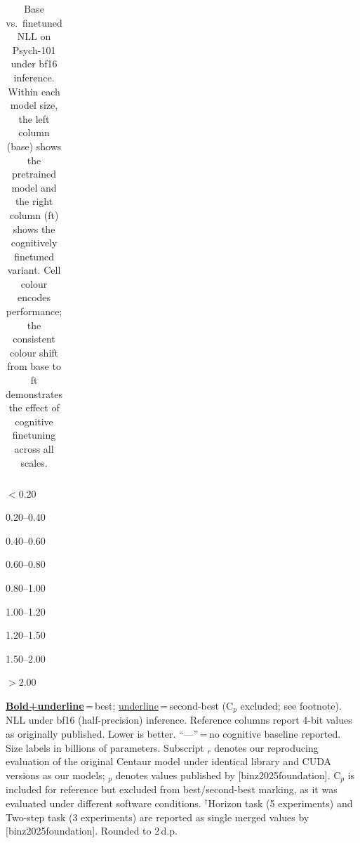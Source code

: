\documentclass{article}
\providecommand{\citet}[1]{[#1]}
\newlength{\ctrtblwd}
\begin{document}
\begin{table}
{{\begin{tabular}{@{}l l  r@{\;\;}r  r@{\;\;}r  r@{\;\;}r  r@{\;\;}r  r@{\;\;}r  r@{\;\;}r  r@{\;\;}r  r@{\;\;}r  r  r  r  r  r@{}}
\bottomrule
\end{tabular}%
}
}%
\setlength{\ctrtblwd}{\wd\ctrtblbox}%
\ifdim\ctrtblwd>\dimexpr\textheight-8pt\relax
  \setlength{\ctrtblwd}{\dimexpr\textheight-8pt\relax}%
\fi
\resizebox{\ctrtblwd}{!}{\usebox{\ctrtblbox}}
\par
\begin{minipage}{\ctrtblwd}
\vspace{4pt}
\begin{center}\footnotesize
\colorbox{c1!45}{\strut\hspace{5pt}} \scriptsize$<$0.20 \quad
\colorbox{c2!40}{\strut\hspace{5pt}} \scriptsize 0.20--0.40 \quad
\colorbox{c3!40}{\strut\hspace{5pt}} \scriptsize 0.40--0.60 \quad
\colorbox{c4!45}{\strut\hspace{5pt}} \scriptsize 0.60--0.80 \quad
\colorbox{c5!55}{\strut\hspace{5pt}} \scriptsize 0.80--1.00 \quad
\colorbox{c6!50}{\strut\hspace{5pt}} \scriptsize 1.00--1.20 \quad
\colorbox{c7!45}{\strut\hspace{5pt}} \scriptsize 1.20--1.50 \quad
\colorbox{c8!40}{\strut\hspace{5pt}} \scriptsize 1.50--2.00 \quad
\colorbox{c9!35}{\strut\hspace{5pt}} \scriptsize$>$2.00
\end{center}
\vspace{-2pt}
{\tiny \underline{\textbf{Bold+underline}}\,=\,best; \underline{underline}\,=\,second-best (C$_p$ excluded; see footnote). NLL under bf16 (half-precision) inference. Reference columns report 4-bit values as originally published. Lower is better. ``---''\,=\,no cognitive baseline reported. Size labels in billions of parameters. Subscript $_r$ denotes our reproducing evaluation of the original Centaur model under identical library and CUDA versions as our models; $_p$ denotes values published by \citet{binz2025foundation}. C$_p$ is included for reference but excluded from best/second-best marking, as it was evaluated under different software conditions. $^\dagger$Horizon task (5 experiments) and Two-step task (3 experiments) are reported as single merged values by \citet{binz2025foundation}. Rounded to 2\,d.p.}
\end{minipage}
\captionsetup{width=\ctrtblwd}
\caption{Base vs.\ finetuned NLL on Psych-101 under bf16 inference. Within each model size, the left column (base) shows the pretrained model and the right column (ft) shows the cognitively finetuned variant. Cell colour encodes performance; the consistent colour shift from base to ft demonstrates the effect of cognitive finetuning across all scales.}
\label{tab:heatmap_baseft_bf16}
\end{table}
\end{document}
